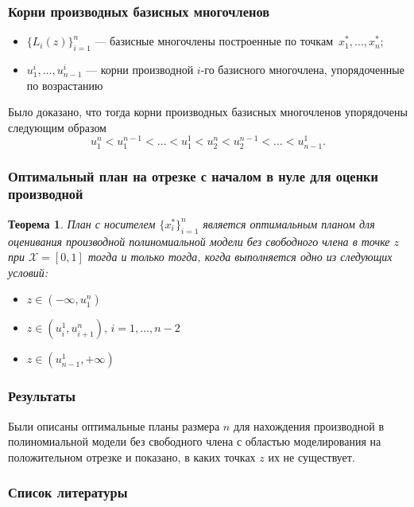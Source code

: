\documentclass[unicode, notheorems, minimal, nologo]{beamer}
\newtheorem{theorem}{Теорема}
\begin{document}
\begin{frame}
	\frametitle{Корни производных базисных многочленов}
	
	\begin{itemize}
		\item $\{L_i(z)\}_{i=1}^n$ --- базисные многочлены построенные по точкам~$x^*_1, \ldots, x^*_n$;
		\item $u_1^i, \ldots, u_{n-1}^i$ --- корни производной $i$-го базисного многочлена, упорядоченные по возрастанию
	\end{itemize}
	Было доказано, что тогда корни производных базисных многочленов упорядочены следующим образом
	\begin{equation*}
		u^n_1 < u^{n-1}_1 < \ldots < u^1_1 < u^n_2 < u^{n-1}_2 < \ldots < u_{n-1}^1.
	\end{equation*}
	
	
\end{frame}

\begin{frame}
	\frametitle{Оптимальный план на отрезке с началом в нуле для оценки производной}
	
	\begin{theorem}
		План с носителем $\{x_i^*\}_{i=1}^n$ является оптимальным планом для оценивания производной полиномиальной модели без свободного члена в точке $z$ при $\mathcal{X} = [0, 1]$ тогда и только тогда, когда выполняется одно из следующих условий:
		\begin{itemize}
			\item $z \in (-\infty, u_1^n)$
			\item $z \in (u_i^1, u_{i+1}^n), \, i = 1, \ldots, n-2$
			\item $z \in (u_{n-1}^1, +\infty)$
		\end{itemize}
	\end{theorem}
\end{frame}

\begin{frame}
	\frametitle{Результаты}
	Были описаны оптимальные планы размера $n$ для нахождения производной в полиномиальной модели без свободного члена с областью моделирования на  положительном отрезке и показано, в каких точках $z$ их не существует.
\end{frame}

\begin{frame}
	\frametitle{Список литературы}
	

\end{frame}
	
\end{document}
